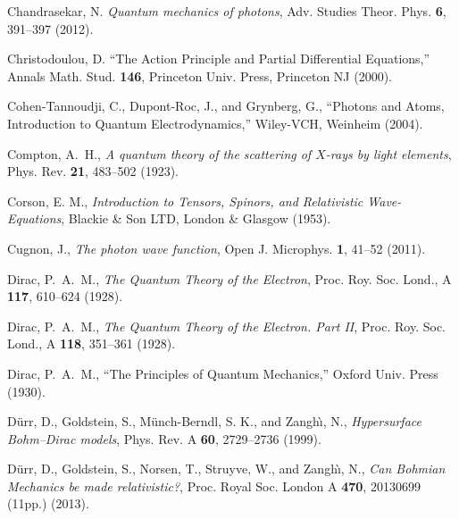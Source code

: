 \documentclass[11pt]{article}
\theoremstyle{definition}
\numberwithin{equation}{section}
\begin{document}
\begin{thebibliography}{[KTZ2020]}
  Chandrasekar, N.
     \textit{Quantum mechanics of photons},
     Adv. Studies Theor. Phys. \textbf{6}, 391--397 (2012). \vspace{-4pt}

   Christodoulou, D.
          ``{The Action Principle and Partial Differential Equations},''
   Annals Math. Stud. {\bf 146},
   Princeton Univ. Press, Princeton NJ (2000).\vspace{-4pt}

   Cohen-Tannoudji, C., Dupont-Roc, J., and Grynberg, G.,
   {``Photons and Atoms, Introduction to Quantum Electrodynamics,''}
   Wiley-VCH, Weinheim (2004).

 Compton, A.~H.,
 \textit{A quantum theory of the scattering of $X$-rays by light elements},
 Phys. Rev. \textbf{21}, 483--502 (1923).\vspace{-4pt}

Corson, E. M.,
\textit{Introduction to Tensors, Spinors, and Relativistic Wave-Equations},
Blackie \& Son LTD, London \& Glasgow (1953).

 Cugnon, J.,
 \textit{The photon wave function},
 Open J. Microphys. \textbf{1}, 41--52 (2011). \vspace{-4pt}

  Dirac, P.~A.~M.,
  \textit{The Quantum Theory of the Electron},
  Proc. Roy. Soc. Lond., A \textbf{117}, 610--624 (1928). \vspace{-4pt}

  Dirac, P.~A.~M.,
  \textit{The Quantum Theory of the Electron. Part II},
  Proc. Roy. Soc. Lond., A \textbf{118}, 351--361 (1928). \vspace{-4pt}

  Dirac, P.~A.~M.,
  ``{The Principles of Quantum Mechanics},''
  Oxford Univ. Press (1930).%


\newblock D\"urr, D., Goldstein, S., M\"unch-Berndl, S. K., and Zangh\`{\i}, N., 
\newblock \textit{Hypersurface Bohm--Dirac models},
\newblock Phys. Rev. A \textbf{60}, 2729--2736 (1999).\vspace{-4pt}

\newblock D\"urr, D., Goldstein, S., Norsen, T., Struyve, W., and Zangh\`{\i}, N., 
\newblock \textit{Can Bohmian Mechanics be made relativistic?},
\newblock Proc. Royal Soc. London A \textbf{470}, 20130699 (11pp.) (2013).\vspace{-4pt}


\end{thebibliography}
\end{document}
